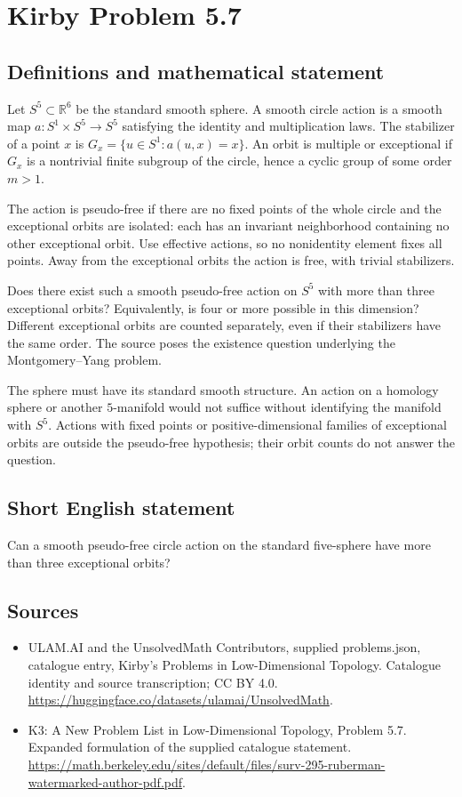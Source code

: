 \documentclass[11pt,a4paper]{article}
\begin{document}
\section*{Kirby Problem 5.7}\label{statement}

\subsection{Definitions and mathematical statement}
Let $S^5\subset\mathbb R^6$ be the standard smooth sphere.
A smooth circle action is a smooth map
$a:S^1\times S^5\to S^5$ satisfying the identity and
multiplication laws. The stabilizer of a point $x$ is
$G_x=\{u\in S^1:a(u,x)=x\}$. An orbit is multiple or
exceptional if $G_x$ is a nontrivial finite subgroup of the
circle, hence a cyclic group of some order $m>1$.

The action is pseudo-free if there are no fixed points of the
whole circle and the exceptional orbits are isolated: each has
an invariant neighborhood containing no other exceptional orbit.
Use effective actions, so no nonidentity element fixes all points.
Away from the exceptional orbits the action is free, with
trivial stabilizers.

Does there exist such a smooth pseudo-free action on $S^5$
with more than three exceptional orbits? Equivalently, is four
or more possible in this dimension? Different exceptional orbits
are counted separately, even if their stabilizers have the same
order. The source poses the existence question underlying the
Montgomery--Yang problem.

The sphere must have its standard smooth structure. An action
on a homology sphere or another $5$-manifold would not suffice
without identifying the manifold with $S^5$. Actions with fixed
points or positive-dimensional families of exceptional orbits
are outside the pseudo-free hypothesis; their orbit counts do
not answer the question.
\subsection{Short English statement}
Can a smooth pseudo-free circle action on the standard five-sphere have more than three exceptional orbits?
\subsection{Sources}
\begin{itemize}
\item[S1] ULAM.AI and the UnsolvedMath Contributors, supplied problems.json, catalogue entry, Kirby's Problems in Low-Dimensional Topology. Catalogue identity and source transcription; CC BY 4.0.
\url{https://huggingface.co/datasets/ulamai/UnsolvedMath}.
\item[S2] K3: A New Problem List in Low-Dimensional Topology, Problem 5.7. Expanded formulation of the supplied catalogue statement.
\url{https://math.berkeley.edu/sites/default/files/surv-295-ruberman-watermarked-author-pdf.pdf}.
\end{itemize}
\end{document}
